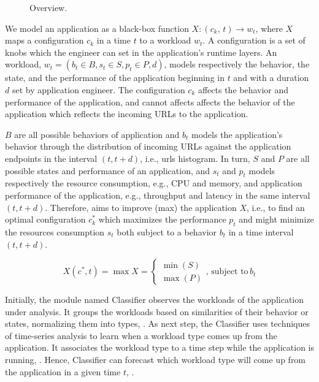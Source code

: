 \begin{figure*}[htp]
    \centering
    \def\svgwidth{\textwidth}
    \scalebox{1.0}{}
    \caption{\name Overview.}
    \label{fig:design-overview}
\end{figure*}

We model an application as a black-box function $X: (c_k,\, t) \rightarrow w_t$,
where $X$ maps a configuration $c_k$ in a time $t$ to a workload $w_t$.  A
configuration is a set of knobs which the engineer can set in the application's
runtime layers. An workload, $w_{t} = (b_t \in B, s_t \in S, p_t \in P, d)$,
models respectively the behavior, the state, and the performance of the
application beginning in $t$ and with a duration $d$ set by application
engineer. The configuration $c_k$ affects the behavior and performance of the
application, and cannot affects affects the behavior of the application which
reflects the incoming URLs to the application.

$B$ are all possible behaviors of application and $b_t$ models the application's
behavior through the distribution of incoming URLs against the application
endpoints in the interval $(t, t+d)$, i.e., urls histogram. In turn, $S$ and $P$
are all possible states and performance of an application, and $s_t$ and $p_t$
models respectively the resource consumption, e.g., CPU and memory, and
application performance of the application, e.g., throughput and latency in the
same interval $(t, t+d)$. Therefore, \name aims to improve (max) the application
$X$, i.e., to find an optimal configuration $c^{*}_{k}$ which maximizes the
performance $p_t$ and might minimize the resources consumption $s_t$ both
subject to a behavior $b_t$ in a time interval $(t, t+d)$. 

\begin{equation}
  X(c^{*}, t) = \max{X} =
  \begin{cases}
    \min(S) \\
    \max(P)
  \end{cases},\, \text{subject to}\, b_t
  \label{eq:optimization}
\end{equation}

Initially, the module named Classifier observes the workloads of the application
under analysis. It groups the workloads based on similarities of their behavior
or states, normalizing them into types, . As next step, the
Classifier uses techniques of time-series analysis to learn when a workload type
comes up from the application. It associates the workload type to a time step
while the application is running, .  Hence, Classifier can
forecast which workload type will come up from the application in a given time
$t$, .

